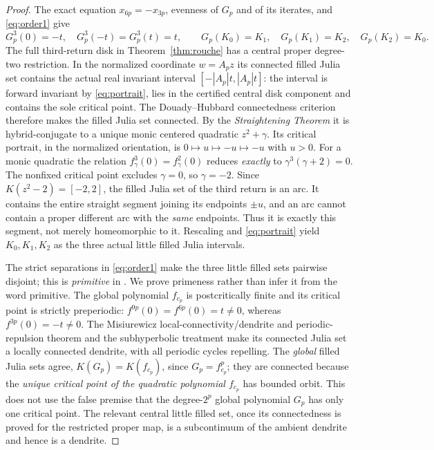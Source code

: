 \begin{proof}
The exact equation $x_{6p}=-x_{3p}$,
evenness of $G_p$ and of its iterates,
and \eqref{eq:order1} give
\begin{equation}\label{eq:portrait}
 G_p^3(0)=-t,\quad G_p^3(-t)=G_p^3(t)=t,\qquad
 G_p(K_0)=K_1,\quad G_p(K_1)=K_2,\quad
 G_p(K_2)=K_0.
\end{equation}
The full third-return disk in Theorem~\ref{thm:rouche}
has a central proper degree-two restriction.
In the normalized coordinate $w=A_pz$ its
connected filled Julia set contains the actual
real invariant interval $[-|A_p|t,|A_p|t]$:
the interval is forward invariant by \eqref{eq:portrait},
lies in the certified central disk component and
contains the sole critical point.  The Douady--Hubbard
connectedness criterion
\cite[Proposition 2]{DH1985} therefore makes the
filled Julia set connected.  By the
\emph{Straightening Theorem}
\cite[Theorem 1]{DH1985} it is hybrid-conjugate
to a unique monic centered quadratic $z^2+\gamma$.
Its critical portrait, in the normalized orientation,
is $0\mapsto u\mapsto -u\mapsto -u$ with $u>0$.
For a monic quadratic the relation
$f_\gamma^3(0)=f_\gamma^2(0)$ reduces
\emph{exactly} to $\gamma^3(\gamma+2)=0$.
The nonfixed critical point excludes $\gamma=0$,
so $\gamma=-2$.  Since $K(z^2-2)=[-2,2]$,
the filled Julia set of the third return is an arc.
It contains the entire straight segment joining
its endpoints $\pm u$, and an arc cannot contain
a proper different arc with the \emph{same}
endpoints.  Thus it is exactly this segment,
not merely homeomorphic to it.  Rescaling and
\eqref{eq:portrait} yield $K_0,K_1,K_2$ as
the three actual little filled Julia intervals.

The strict separations in \eqref{eq:order1}
make the three little filled sets pairwise
disjoint; this is \emph{primitive}
in \cite[\S2.3]{KKL2026}.  We prove primeness
rather than infer it from the word primitive.
The global polynomial $f_{c_p}$ is postcritically
finite and its critical point is strictly
preperiodic: $f^{9p}(0)=f^{6p}(0)=t\ne0$,
whereas $f^{3p}(0)=-t\ne0$.
The Misiurewicz local-connectivity/dendrite and
periodic-repulsion theorem
\cite[Theorem 27.4]{LyubichNotes}
and the subhyperbolic treatment
\cite[\S17]{Milnor2006} make its connected
Julia set a locally connected dendrite,
with all periodic cycles repelling.
The \emph{global} filled Julia sets agree,
$K(G_p)=K(f_{c_p})$, since $G_p=f_{c_p}^p$;
they are connected because the \emph{unique
critical point of the quadratic polynomial
$f_{c_p}$} has bounded orbit.  This does
not use the false premise that the
degree-$2^p$ global polynomial $G_p$
has only one critical point.  The relevant
central little filled set, once its
connectedness is proved for the restricted
proper map, is a subcontinuum of the
ambient dendrite and hence is a dendrite.


\end{proof}

